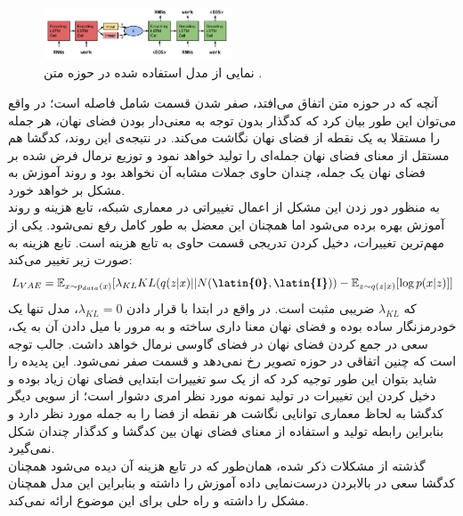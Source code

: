 \begin{figure}[H]
	\centering
	\includegraphics[width=0.5\textwidth]{images/vae-text.png}
	\caption{
		نمایی از مدل \vae{} استفاده شده در حوزه متن
		\cite{vae-text}.}
	\label{fig:vae-text}
\end{figure}
آنچه که در حوزه متن اتفاق می‌افتد، صفر شدن قسمت شامل فاصله   است؛ در واقع می‌توان این طور بیان کرد که کدگذار بدون توجه به معنی‌دار بودن فضای نهان، هر جمله را مستقلا به یک نقطه از فضای نهان نگاشت می‌کند. در نتیجه‌ی این روند، کدگشا هم مستقل از معنای فضای نهان جمله‌ای را تولید خواهد نمود و توزیع نرمال فرض شده بر فضای نهان یک جمله، چندان حاوی جملات مشابه آن نخواهد بود و روند آموزش به مشکل بر خواهد خورد. \\
به منظور دور زدن این مشکل از اعمال تغییراتی در معماری شبکه، تابع هزینه و روند آموزش بهره برده می‌شود \cite{improved-text-vae, hybrid-text-vae} اما همچنان این معضل به طور کامل رفع نمی‌شود. یکی از مهم‌ترین تغییرات، دخیل کردن تدریجی قسمت حاوی  به تابع هزینه است. تابع هزینه به صورت زیر تغییر می‌کند:
\begin{equation}
	\begin{split}
		L_{VAE} = \expected_{x \sim p_{data}(x)} [\lambda_{KL} KL(q(z|x) || N(\textbf{\latin{0}},\textbf{\latin{I}}))- \expected_{z \sim q(z|x)}[\log p(x|z)]]
	\end{split}
\end{equation}
که $\lambda_{KL}$ ضریبی مثبت است. در واقع در ابتدا با قرار دادن $\lambda_{KL}=0$، مدل تنها یک خودرمزنگار ساده بوده و فضای نهان معنا داری ساخته و به مرور با میل دادن آن به یک، سعی در جمع کردن فضای نهان در فضای گاوسی نرمال خواهد داشت. جالب توجه است که چنین اتفاقی در حوزه تصویر رخ نمی‌دهد و قسمت  صفر نمی‌شود. این پدیده را شاید بتوان این طور توجیه کرد که از یک سو تغییرات ابتدایی فضای نهان زیاد بوده و دخیل کردن این تغییرات در تولید نمونه مورد نظر امری دشوار است؛ از سویی دیگر کدگشا به لحاظ معماری توانایی نگاشت هر نقطه از فضا را به جمله مورد نظر دارد و بنابراین رابطه تولید و استفاده از معنای فضای نهان بین کدگشا و کدگذار چندان شکل نمی‌گیرد.\\
گذشته از مشکلات ذکر شده، همان‌طور که در تابع هزینه آن دیده می‌شود همچنان کدگشا سعی در بالابردن درست‌نمایی داده آموزش را داشته و بنابراین این مدل همچنان مشکل \expbias{} را داشته و راه حلی برای این موضوع ارائه نمی‌کند.

